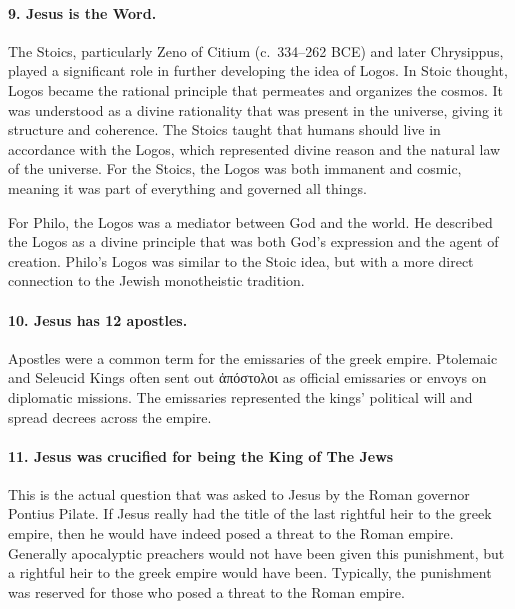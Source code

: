 \paragraph{9.
Jesus is the Word.}\label{par:jesus-is-the-word.}

The Stoics, particularly Zeno of Citium (c.~334--262 BCE) and later Chrysippus, played a significant role in further developing the idea of Logos.
In Stoic thought, Logos became the rational principle that permeates and organizes the cosmos.
It was understood as a divine rationality that was present in the universe, giving it structure and coherence.
The Stoics taught that humans should live in accordance with the Logos, which represented divine reason and the natural law of the universe.
For the Stoics, the Logos was both immanent and cosmic, meaning it was part of everything and governed all things.

For Philo, the Logos was a mediator between God and the world.
He described the Logos as a divine principle that was both God's expression and the agent of creation.
Philo's Logos was similar to the Stoic idea, but with a more direct connection to the Jewish monotheistic tradition.

\paragraph{10.
Jesus has 12 apostles.}\label{par:jesus-has-12-apostles.}

Apostles were a common term for the emissaries of the greek empire.
Ptolemaic and Seleucid Kings often sent out ἀπόστολοι as official emissaries or envoys on diplomatic missions.
The emissaries represented the kings' political will and spread decrees across the empire.

\paragraph{11.
Jesus was crucified for being the King of The Jews}\label{par:jesus-was-crucified-for-being-the-king-of-the-jews}

This is the actual question that was asked to Jesus by the Roman governor Pontius Pilate.
If Jesus really had the title of the last rightful heir to the greek empire, then he would have indeed posed a threat to the Roman empire.
Generally apocalyptic preachers would not have been given this punishment, but a rightful heir to the greek empire would have been.
Typically, the punishment was reserved for those who posed a threat to the Roman empire.

